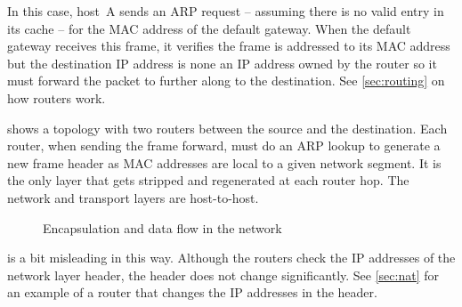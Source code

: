 {In this case, host~A sends an ARP request -- assuming there is no valid entry in its cache -- for the MAC address of the default gateway.
When the default gateway receives this frame, it verifies the frame is addressed to its MAC address but the destination IP address is none an IP address owned by the router so it must forward the packet to further along to the destination.
See \vref{sec:routing} on how routers work.

 shows a topology with two routers between the source and the destination.
Each router, when sending the frame forward, must do an ARP lookup to generate a new frame header as MAC addresses are local to a given network segment.
It is the only layer that gets stripped and regenerated at each router hop.
The network and transport layers are host-to-host.


\begin{figure}
\centering

\caption{Encapsulation and data flow in the network}
\label{fig:data-flow}
\end{figure}


 is a bit misleading in this way.
Although the routers check the IP addresses of the network layer header, the header does not change significantly.
See \vref{sec:nat} for an example of a router that changes the IP addresses in the header.
}

\label{sec:network-icons}

